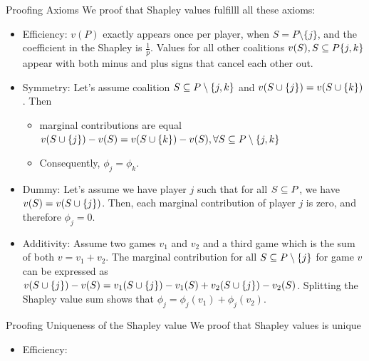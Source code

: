 \documentclass[11pt,compress,t,notes=noshow, xcolor=table]{beamer}
\begin{document}
\begin{vbframe}{Proofing Axioms}
  We proof that Shapley values fulfilll all these axioms:
\begin{itemize}
  \item Efficiency: $v(P)$ exactly appears once per player, when $S = P \setminus \{j\}$, and the coefficient in the Shapley is $\frac{1}{p}$. Values for all other coalitions $v(S), \SsubP \{j,k\}$ appear with both minus and plus signs that cancel each other out.
  \item Symmetry: Let's assume coalition $\SsubPnojk$ and $v(\Scupj) = v(\Scupk)$. Then
    \begin{itemize}
        \item marginal contributions are equal $v(\Scupj) -  v(S) = v(\Scupk) -  v(S), \forall \SsubPnojk$
        \item Consequently, $\phi_j = \phi_k$.
    \end{itemize}
  \item Dummy: Let's assume we have player $j$ such that for all $\SsubP$, we have $v(S) = v(\Scupj)$. Then, each marginal contribution of player $j$ is zero, and therefore $\phi_j = 0$.
  \item Additivity:  Assume two games $v_1$ and $v_2$ and a third game which is the sum of both $v = v_1 + v_2$. The marginal contribution for all $\SsubPnoj$ for game $v$ can be expressed as $v(\Scupj) - v(S) = v_1(\Scupj) - v_1(S) + v_2(\Scupj) - v_2(S)$. Splitting the Shapley value sum shows that $\phi_j = \phi_j(v_1) + \phi_j(v_2)$.
\end{itemize}
\end{vbframe}

\begin{vbframe}{Proofing Uniqueness of the Shapley value}
  We proof that Shapley values is unique
\begin{itemize}
    \item Efficiency: 
\end{itemize}
\end{vbframe}
\end{document}
